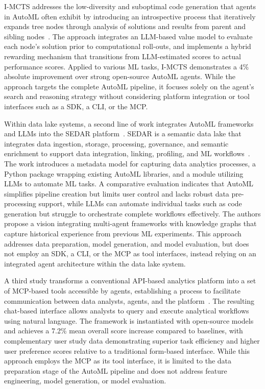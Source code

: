 \documentclass[
english,                 %
bibtex,                  %
]{kththesis}
\numberwithin{listing}{chapter}
\begin{document}
\gls{I-MCTS} addresses the low-diversity and suboptimal code generation that agents in \gls{AutoML} often exhibit by introducing an introspective process that iteratively expands tree nodes through analysis of solutions and results from parent and sibling nodes~\cite{liang_i-mcts_2026}. The approach integrates an \gls{LLM}-based value model to evaluate each node's solution prior to computational roll-outs, and implements a hybrid rewarding mechanism that transitions from \gls{LLM}-estimated scores to actual performance scores. Applied to various \gls{ML} tasks, \gls{I-MCTS} demonstrates a 4\% absolute improvement over strong open-source \gls{AutoML} agents. While the approach targets the complete \gls{AutoML} pipeline, it focuses solely on the agent's search and reasoning strategy without considering platform integration or tool interfaces such as a \gls{SDK}, a \gls{CLI}, or the \gls{MCP}.

Within data lake systems, a second line of work integrates \gls{AutoML} frameworks and \glspl{LLM} into the \gls{SEDAR} platform~\cite{hoseini_towards_2025}. \gls{SEDAR} is a semantic data lake that integrates data ingestion, storage, processing, governance, and semantic enrichment to support data integration, linking, profiling, and \gls{ML} workflows~\cite{hoseini_sedar_2023}.  The work introduces a metadata model for capturing data analytics processes, a Python package wrapping existing \gls{AutoML} libraries, and a module utilizing \glspl{LLM} to automate \gls{ML} tasks. A comparative evaluation indicates that \gls{AutoML} simplifies pipeline creation but limits user control and lacks robust data pre-processing support, while \glspl{LLM} can automate individual tasks such as code generation but struggle to orchestrate complete workflows effectively. The authors propose a vision integrating multi-agent frameworks with knowledge graphs that capture historical experience from previous \gls{ML} experiments. This approach addresses data preparation, model generation, and model evaluation, but does not employ an \gls{SDK}, a \gls{CLI}, or the \gls{MCP} as tool interfaces, instead relying on an integrated agent architecture within the data lake system.

A third study transforms a conventional \gls{API}-based analytics platform into a set of \gls{MCP}-based tools accessible by agents, establishing a process to facilitate communication between data analysts, agents, and the platform~\cite{fikardos_generative_2026}. The resulting chat-based interface allows analysts to query and execute analytical workflows using natural language. The framework is instantiated with open-source models and achieves a 7.2\% mean overall score increase compared to baselines, with complementary user study data demonstrating superior task efficiency and higher user preference scores relative to a traditional form-based interface. While this approach employs the \gls{MCP} as its tool interface, it is limited to the data preparation stage of the \gls{AutoML} pipeline and does not address feature engineering, model generation, or model evaluation.
\end{document}
